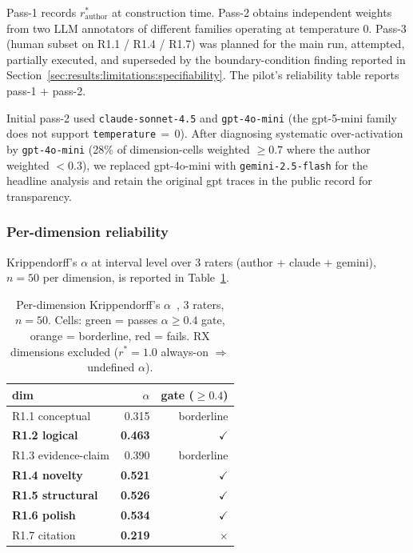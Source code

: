 Pass-1 records $r^*_{\text{author}}$ at construction time. Pass-2 obtains independent weights from two LLM annotators of different families operating at temperature 0. Pass-3 (human subset on R1.1 / R1.4 / R1.7) was planned for the main run, attempted, partially executed, and superseded by the boundary-condition finding reported in Section~\ref{sec:results:limitations:specifiability}. The pilot's reliability table reports pass-1 + pass-2.

Initial pass-2 used \texttt{claude-sonnet-4.5} and \texttt{gpt-4o-mini} (the gpt-5-mini family does not support \texttt{temperature}\,$=$\,$0$). After diagnosing systematic over-activation by \texttt{gpt-4o-mini} (28\% of dimension-cells weighted $\geq 0.7$ where the author weighted $< 0.3$), we replaced gpt-4o-mini with \texttt{gemini-2.5-flash} for the headline analysis and retain the original gpt traces in the public record for transparency.

\subsubsection{Per-dimension reliability}
\label{sec:results:dataset:alpha}

Krippendorff's $\alpha$ at interval level over 3 raters (author + claude + gemini), $n = 50$ per dimension, is reported in Table~\ref{tab:alpha}.

\begin{table}[t]
\centering
\caption{Per-dimension Krippendorff's $\alpha$~\cite{krippendorff2011alpha, hayes2007standard}, 3 raters, $n=50$. Cells: green = passes $\alpha \geq 0.4$ gate, orange = borderline, red = fails. RX dimensions excluded ($r^*=1.0$ always-on $\Rightarrow$ undefined $\alpha$).}
\label{tab:alpha}
\begin{tabular}{lrr}
\toprule
\textbf{dim} & $\alpha$ & \textbf{gate ($\geq 0.4$)} \\
\midrule
R1.1 conceptual         & \cellcolor{HMMid}0.315          & \cellcolor{HMBackground}borderline \\
\textbf{R1.2 logical}   & \cellcolor{HMGood}\textbf{0.463} & \cellcolor{HMGood}\textbf{$\checkmark$} \\
R1.3 evidence-claim     & \cellcolor{HMMid}0.390          & \cellcolor{HMBackground}borderline \\
\textbf{R1.4 novelty}   & \cellcolor{HMGood}\textbf{0.521} & \cellcolor{HMGood}\textbf{$\checkmark$} \\
\textbf{R1.5 structural}& \cellcolor{HMGood}\textbf{0.526} & \cellcolor{HMGood}\textbf{$\checkmark$} \\
\textbf{R1.6 polish}    & \cellcolor{HMGood}\textbf{0.534} & \cellcolor{HMGood}\textbf{$\checkmark$} \\
R1.7 citation           & \cellcolor{HMHigh}\textbf{0.219}          & \cellcolor{HMHigh}\textbf{$\times$} \\
\bottomrule
\end{tabular}
\end{table}

